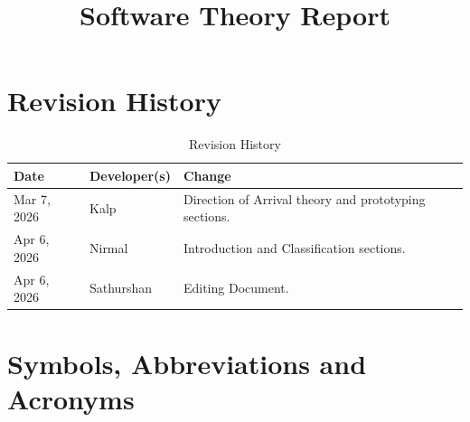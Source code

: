 \documentclass[12pt, titlepage]{article}
\begin{document}
\title{Software Theory Report\\\progname}

\author{\authname}

\date{}

\maketitle


\newpage
\section{Revision History}

\begin{table}[hp]
\caption{Revision History} \label{TblRevisionHistory}
\begin{tabularx}{\textwidth}{llX}
\toprule
\textbf{Date} & \textbf{Developer(s)} & \textbf{Change}\\
\midrule
Mar 7, 2026 & Kalp & Direction of Arrival theory and prototyping sections.\\
Apr 6, 2026 & Nirmal & Introduction and Classification sections.\\
Apr 6, 2026 & Sathurshan & Editing Document. \\
\bottomrule
\end{tabularx}
\end{table}

\newpage

\section{Symbols, Abbreviations and Acronyms}
\end{document}
